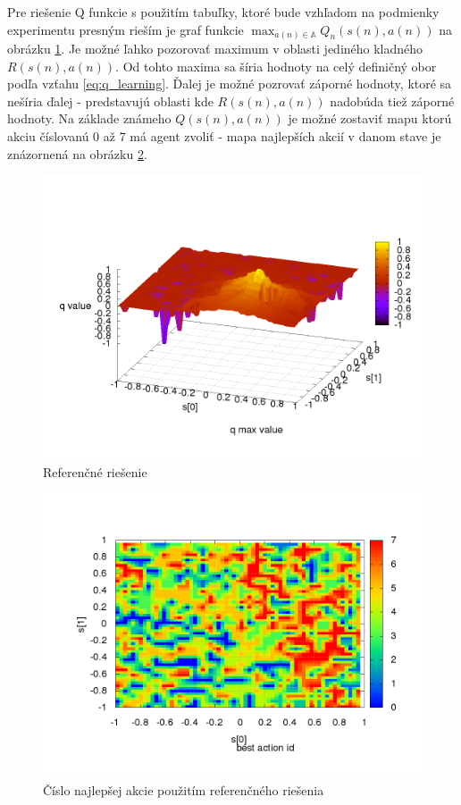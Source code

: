 Pre riešenie Q funkcie s použitím tabuľky, ktoré bude vzhľadom na podmienky experimentu presným
rieším je graf funkcie $\max_{a(n) \in \mathbb{A}} Q_{n}(s(n), a(n))$ na obrázku \ref{img:experiment_reference}.
Je možné ľahko pozorovať maximum v oblasti jediného kladného $R(s(n), a(n))$. Od tohto
maxima sa šíria hodnoty na celý definičný obor podľa vzťahu \ref{eq:q_learning}. Ďalej
je možné pozrovať záporné hodnoty, ktoré sa nešíria ďalej - predstavujú oblasti kde $R(s(n), a(n))$
nadobúda tiež záporné hodnoty. Na základe známeho $Q(s(n),a(n))$ je možné
zostaviť mapu ktorú akciu číslovanú 0 až 7 má agent zvoliť - mapa najlepších
akcií v danom stave je znázornená na obrázku \ref{img:experiment_reference_action}.

\begin{figure}[!htb]
\centering
\includegraphics[scale=.4]{../../results_q_learning/map_2/function_type_0/iterations_10/q_learning_result.png}
\caption{Referenčné riešenie}
\label{img:experiment_reference}
\end{figure}

\begin{figure}[!htb]
\centering
\includegraphics[scale=.4]{../../results_q_learning/map_2/function_type_0/iterations_10/action_best_value_log_surface.png}
\caption{Číslo najlepšej akcie použitím referenčného riešenia}
\label{img:experiment_reference_action}
\end{figure}

